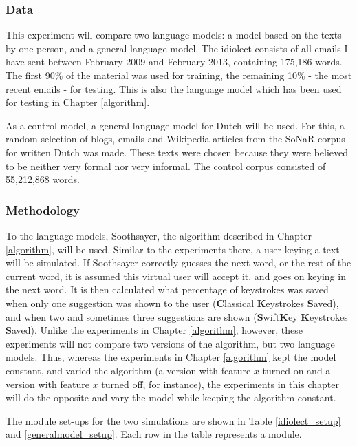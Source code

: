 \documentclass[11pt]{article}
\begin{document}
\subsubsection{Data} \label{data_simple}
This experiment will compare two language models: a model based on the texts by one person, and a general language model. The idiolect consists of all emails I have sent between February 2009 and February 2013, containing 175,186 words. The first 90\% of the material was used for training, the remaining 10\% - the most recent emails - for testing. This is also the language model which has been used for testing in Chapter \ref{algorithm}. 

As a control model, a general language model for Dutch will be used. For this, a random selection of blogs, emails and Wikipedia articles from the SoNaR corpus for written Dutch  was made. These texts were chosen because they were believed to be neither very formal nor very informal. The control corpus consisted of 55,212,868 words.

\subsubsection{Methodology}
To the language models, Soothsayer, the algorithm described in Chapter \ref{algorithm}, will be used. Similar to the experiments there, a user keying a text will be simulated. If Soothsayer correctly guesses the next word, or the rest of the current word, it is assumed this virtual user will accept it, and goes on keying in the next word. It is then calculated what percentage of keystrokes was saved when only one suggestion was shown to the user (\textbf{C}lassical \textbf{K}eystrokes \textbf{S}aved), and when two and sometimes three suggestions are shown (\textbf{S}wift\textbf{K}ey \textbf{K}eystrokes \textbf{S}aved). Unlike the experiments in Chapter \ref{algorithm}, however, these experiments will not compare two versions of the algorithm, but two language models. Thus, whereas the experiments in Chapter \ref{algorithm} kept the model constant, and varied the algorithm (a version with feature $x$ turned on and a version with feature $x$ turned off, for instance), the experiments in this chapter will do the opposite and vary the model while keeping the algorithm constant. 

The module set-ups for the two simulations are shown in Table \ref{idiolect_setup} and \ref{generalmodel_setup}. Each row in the table represents a module.
\end{document}
